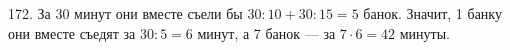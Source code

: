 172. За 30 минут они вместе съели бы $30:10+30:15=5$ банок. Значит, 1 банку они вместе съедят за $30:5=6$ минут, а 7 банок --- за $7\cdot6=42$ минуты.\\
